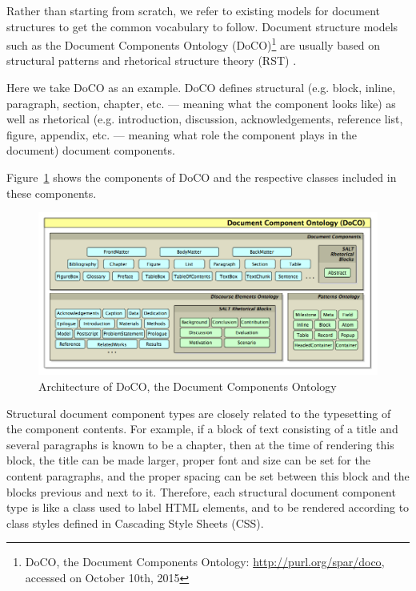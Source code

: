 Rather than starting from scratch, we refer to existing models for document structures to get the common vocabulary to follow. Document structure models such as the Document Components Ontology (DoCO)\footnote{DoCO, the Document Components Ontology: \url{http://purl.org/spar/doco}, accessed on October 10th, 2015} are usually based on structural patterns \cite{di2014dealing} and rhetorical structure theory (RST) \cite{taboada2006rhetorical}.

Here we take DoCO as an example. DoCO defines structural (e.g. block, inline, paragraph, section, chapter, etc. --- meaning what the component looks like) as well as rhetorical (e.g. introduction, discussion, acknowledgements, reference list, figure, appendix, etc. --- meaning what role the component plays in the document) document components.

Figure~\ref{fig:doco} shows the components of DoCO and the respective classes included in these components.
\begin{figure}
	\centering
	\includegraphics[width=\textwidth]{doco-architecture.png}
	\caption[Architecture of DoCO]{Architecture of DoCO, the Document Components Ontology}
	\label{fig:doco}
\end{figure}

Structural document component types are closely related to the typesetting of the component contents. For example, if a block of text consisting of a title and several paragraphs is known to be a chapter, then at the time of rendering this block, the title can be made larger, proper font and size can be set for the content paragraphs, and the proper spacing can be set between this block and the blocks previous and next to it. Therefore, each structural document component type is like a class used to label HTML elements, and to be rendered according to class styles defined in Cascading Style Sheets (CSS).

